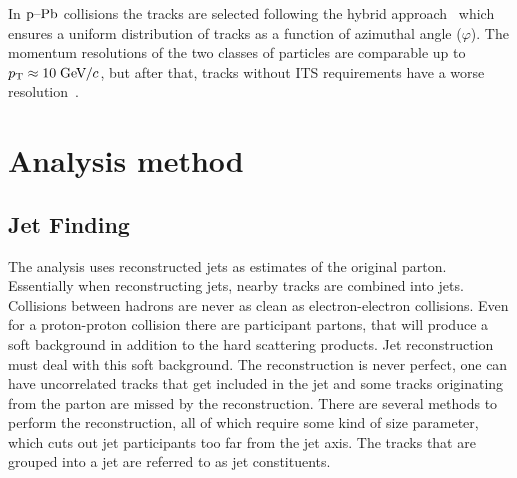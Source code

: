 In $\mbox{p--Pb}$ collisions the tracks are selected following the hybrid approach~\cite{hybridExplanation} which ensures a uniform distribution of tracks as a function of azimuthal angle ($\varphi$). The momentum resolutions of the two classes of particles are comparable up to $p_{\rm T} \approx 10\;\mathrm{GeV}\kern-0.05em/\kern-0.02em c$, but after that, tracks without ITS requirements have a worse resolution~\cite{alicePerformance,aliceBackgroundFluctuation}.



\section{Analysis method}
\label{sec:methods}
\subsection{Jet Finding}
The analysis uses reconstructed jets as estimates of the original parton. Essentially when reconstructing jets, nearby tracks are combined into jets. Collisions between hadrons are never as clean as electron-electron collisions. Even for a proton-proton collision there are participant partons, that will produce a soft background in addition to the hard scattering products. Jet reconstruction must deal with this soft background. The reconstruction is never perfect, one can have uncorrelated tracks that get included in the jet and some tracks originating from the parton are missed by the reconstruction. There are several methods to perform the reconstruction, all of which require some kind of size parameter, which cuts out jet participants too far from the jet axis. The tracks that are grouped into a jet are referred to as jet constituents. 

